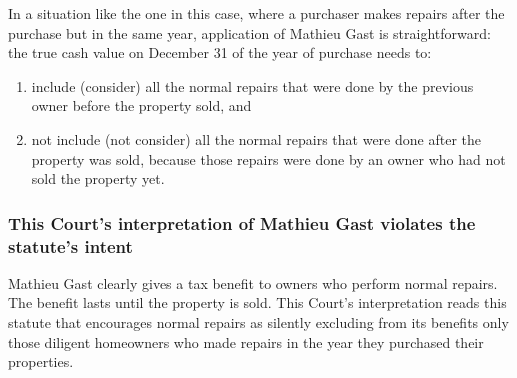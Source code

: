 \documentclass[12pt,\documentclassflag]{michiganCourtOfAppealsBrief}
\begin{document}



In a situation like the one in this case, where a purchaser makes repairs after the purchase but in the same year, application of Mathieu Gast is straightforward: the true cash value on December 31 of the year of purchase needs to:

\begin{enumerate}
  
\item include (consider) all the normal repairs that were done by the previous owner before the property sold, and 

\item  not include (not consider) all the normal repairs that were done after the property was sold, because those repairs were done by an owner who had not sold the property yet.
\end{enumerate}


\subsubsection{This Court's interpretation of Mathieu Gast violates the statute's intent}

Mathieu Gast clearly gives a tax benefit to owners who perform normal repairs. The benefit lasts until the property is sold. This Court's interpretation reads this statute that encourages normal repairs as silently excluding from its benefits only those diligent homeowners who made repairs in the year they purchased their properties.
\end{document}

